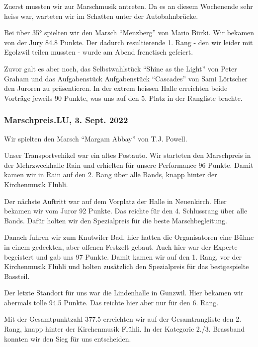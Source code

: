 \begin{history}
    Zuerst mussten wir zur Marschmusik antreten. Da es an diesem Wochenende sehr
    heiss war, warteten wir im Schatten unter der Autobahnbrücke.

    Bei über 35° spielten wir den Marsch \enquote{Menzberg} von Mario Bürki. Wir
    bekamen von der Jury 84.8 Punkte. Der dadurch resultierende 1. Rang - den
    wir leider mit Egolzwil teilen mussten - wurde am Abend frenetisch gefeiert.

    Zuvor galt es aber noch, das Selbstwahlstück \enquote{Shine as the Light}
    von Peter Graham und das Aufgabenstück Aufgabenstück \enquote{Cascades} von
    Sami Lörtscher den Juroren zu präsentieren.
    In der extrem heissen Halle erreichten beide Vorträge jeweils 90 Punkte, was
    uns auf den 5. Platz in der Rangliste brachte.

    \subsubsection*{Marschpreis.LU, 3. Sept. 2022}

    Wir spielten den Marsch \enquote{Margam Abbay} von T.J. Powell.

    Unser Transportvehikel war ein altes Postauto. Wir starteten den Marschpreis
    in der Mehrzweckhalle Rain und erhielten für unsere Performance 96 Punkte.
    Damit kamen wir in Rain auf den 2. Rang über alle Bands, knapp hinter der
    Kirchenmusik Flühli.

    Der nächste Auftritt war auf dem Vorplatz der Halle in Neuenkirch. Hier
    bekamen wir vom Juror 92 Punkte. Das reichte für den 4. Schlussrang über
    alle Bands. Dafür holten wir den Spezialpreis für die beste
    Marschbegleitung.

    Danach fuhren wir zum Knutwiler Bad, hier hatten die Organisatoren eine
    Bühne in einem gedeckten, aber offenen Festzelt gebaut. Auch hier war der
    Experte begeistert und gab uns 97 Punkte. Damit kamen wir auf den 1. Rang,
    vor der Kirchenmusik Flühli und holten zusätzlich den Spezialpreis für das
    bestgespielte Bassteil.

    Der letzte Standort für uns war die Lindenhalle in Gunzwil. Hier bekamen wir
    abermals tolle 94.5 Punkte. Das reichte hier aber nur für den 6. Rang.

    Mit der Gesamtpunktzahl 377.5 erreichten wir auf der Gesamtrangliste den 2.
    Rang, knapp hinter der Kirchenmusik Flühli. In der Kategorie 2./3. Brassband
    konnten wir den Sieg für uns entscheiden.

\end{history}